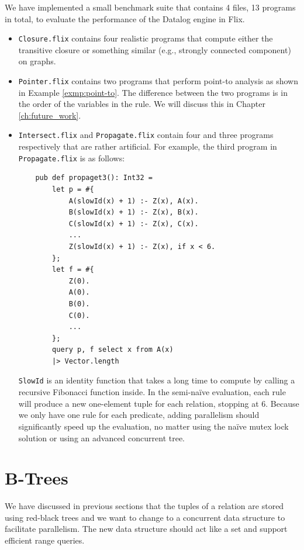 \documentclass[11pt]{report}
\theoremstyle{definition}
\begin{document}
We have implemented a small benchmark suite that contains 4 files, 13 programs in total, to evaluate the performance of the Datalog engine in Flix.
\begin{itemize}
  \item \texttt{Closure.flix} contains four realistic programs that compute either the transitive closure or something similar (e.g., strongly connected component) on graphs.
  \item \texttt{Pointer.flix} contains two programs that perform point-to analysis as shown in Example \ref{exmp:point-to}. The difference between the two programs is in the order of the variables in the rule. We will discuss this in Chapter \ref{ch:future_work}.
  \item \texttt{Intersect.flix} and \texttt{Propagate.flix} contain four and three programs respectively that are rather artificial. For example, the third program in \texttt{Propagate.flix} is as follows:
        \begin{verbatim}
    pub def propaget3(): Int32 =
        let p = #{
            A(slowId(x) + 1) :- Z(x), A(x).
            B(slowId(x) + 1) :- Z(x), B(x).
            C(slowId(x) + 1) :- Z(x), C(x).
            ...
            Z(slowId(x) + 1) :- Z(x), if x < 6.
        };
        let f = #{
            Z(0).
            A(0).
            B(0).
            C(0).
            ...
        };
        query p, f select x from A(x)
        |> Vector.length
  \end{verbatim}
        \texttt{SlowId} is an identity function that takes a long time to compute by calling a recursive Fibonacci function inside. In the semi-naïve evaluation, each rule will produce a new one-element tuple for each relation, stopping at 6. Because we only have one rule for each predicate, adding parallelism should significantly speed up the evaluation, no matter using the naïve mutex lock solution or using an advanced concurrent tree.
\end{itemize}


\chapter{B-Trees}
\label{ch:btrees}

We have discussed in previous sections that the tuples of a relation are stored using red-black trees and we want to change to a concurrent data structure to facilitate parallelism. The new data structure should act like a set and support efficient range queries.
\end{document}
